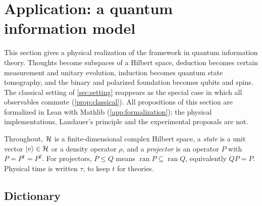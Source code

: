 \section{Application: a quantum information model}\label{sec:quantum}

This section gives a physical realization of the framework in quantum information theory. Thoughts
become subspaces of a Hilbert space, deduction becomes certain measurement and unitary evolution,
induction becomes quantum state tomography, and the binary and polarized foundation becomes qubits
and spins. The classical setting of \cref{sec:setting} reappears as the special case in which all
observables commute (\cref{prop:classical}). All propositions of this section are formalized in
Lean with Mathlib (\cref{app:formalization}); the physical implementations, Landauer's principle and
the experimental proposals are not.

Throughout, $\mathcal H$ is a finite-dimensional complex Hilbert space, a \emph{state} is a unit vector
$\lvert v\rangle\in\mathcal H$ or a density operator $\rho$, and a \emph{projector} is an operator $P$ with
$P=P^\dagger=P^2$. For projectors, $P\le Q$ means $\operatorname{ran}P\subseteq\operatorname{ran}Q$,
equivalently $QP=P$. Physical time is written $\tau$, to keep $t$ for theories.

\subsection{Dictionary}

